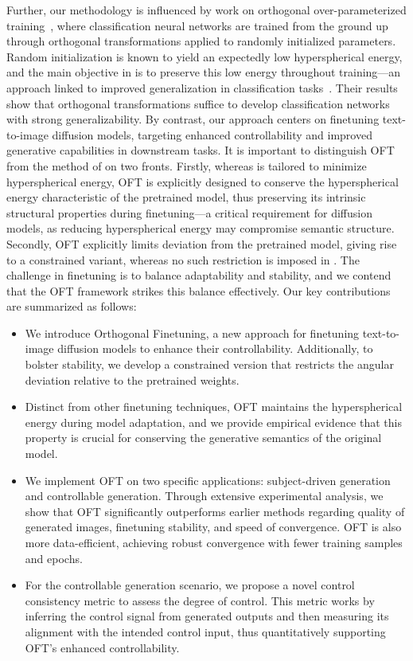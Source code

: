 Further, our methodology is influenced by work on orthogonal over-parameterized training~\cite{liu2021orthogonal}, where classification neural networks are trained from the ground up through orthogonal transformations applied to randomly initialized parameters. Random initialization is known to yield an expectedly low hyperspherical energy, and the main objective in \cite{liu2021orthogonal} is to preserve this low energy throughout training—an approach linked to improved generalization in classification tasks~\cite{liu2018learning,lin2020regularizing}. Their results show that orthogonal transformations suffice to develop classification networks with strong generalizability. By contrast, our approach centers on finetuning text-to-image diffusion models, targeting enhanced controllability and improved generative capabilities in downstream tasks. It is important to distinguish OFT from the method of \cite{liu2021orthogonal} on two fronts. Firstly, whereas \cite{liu2021orthogonal} is tailored to minimize hyperspherical energy, OFT is explicitly designed to conserve the hyperspherical energy characteristic of the pretrained model, thus preserving its intrinsic structural properties during finetuning—a critical requirement for diffusion models, as reducing hyperspherical energy may compromise semantic structure. Secondly, OFT explicitly limits deviation from the pretrained model, giving rise to a constrained variant, whereas no such restriction is imposed in \cite{liu2021orthogonal}. The challenge in finetuning is to balance adaptability and stability, and we contend that the OFT framework strikes this balance effectively. Our key contributions are summarized as follows:

\begin{itemize}[leftmargin=*,nosep]

    \item We introduce Orthogonal Finetuning, a new approach for finetuning text-to-image diffusion models to enhance their controllability. Additionally, to bolster stability, we develop a constrained version that restricts the angular deviation relative to the pretrained weights.
    \item Distinct from other finetuning techniques, OFT maintains the hyperspherical energy during model adaptation, and we provide empirical evidence that this property is crucial for conserving the generative semantics of the original model.
    \item We implement OFT on two specific applications: subject-driven generation and controllable generation. Through extensive experimental analysis, we show that OFT significantly outperforms earlier methods regarding quality of generated images, finetuning stability, and speed of convergence. OFT is also more data-efficient, achieving robust convergence with fewer training samples and epochs.
    \item For the controllable generation scenario, we propose a novel control consistency metric to assess the degree of control. This metric works by inferring the control signal from generated outputs and then measuring its alignment with the intended control input, thus quantitatively supporting OFT’s enhanced controllability.
\end{itemize}

